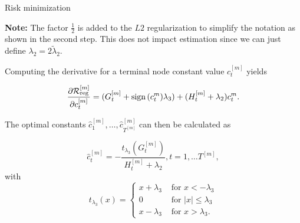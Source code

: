 \documentclass[11pt,compress,t,notes=noshow, xcolor=table]{beamer}
\begin{document}
\begin{vbframe}{Risk minimization}
    \lz

    \textbf{Note:} The factor $\frac12$ is added to the $L2$ regularization to simplify the notation as shown in the second step.
    This does not impact estimation since we can just define $\lambda_2 = 2\tilde\lambda_2$.

    \framebreak

    Computing the derivative for a terminal node constant value $c^{[m]}_t$ yields

    $$
    \frac{\partial \mathcal{R}_{\text{reg}}^{[m]}}{\partial c^{[m]}_t} = (G^{[m]}_t + \operatorname{sign}{(c^{m}_t)}\lambda_3) + (H^{[m]}_t + \lambda_2) c^{m}_t.
    $$

    The optimal constants $\hat{c}^{[m]}_1,\dots, \hat{c}^{[m]}_{T^{[m]}}$ can then be calculated as

    \lz
    $$
    \hat{c}^{[m]}_t = - \frac{t_{\lambda_3}\left(G^{[m]}_t\right)}{H^{[m]}_t + \lambda_2}, t=1,\dots T^{[m]},
    $$
    with $$t_{\lambda_3}(x) = \begin{cases}
      x + \lambda_3 &\text{ for } x < - \lambda_3 \\
      0  &\text{ for } |x| \leq \lambda_3 \\
      x - \lambda_3 &\text{ for } x > \lambda_3.
    \end{cases}$$

    \end{vbframe}
\end{document}
